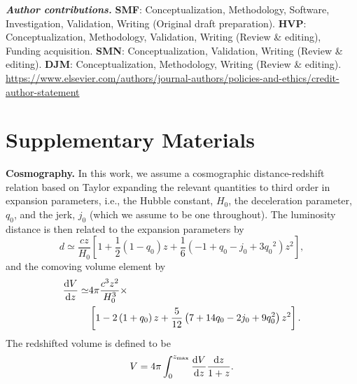\documentclass[%
 reprint,
 superscriptaddress,
 nofootinbib,
 amsmath,amssymb,
 aps,
]{revtex4-2}
\newcommand{\hubble}{\ensuremath{H_0}}
\newcommand{\decel}{\ensuremath{q_0}}
\newcommand{\jerk}{\ensuremath{j_0}}
\newcommand{\zmax}{\ensuremath{z_{\rm max}}}
\begin{document}
\textbf{\emph{Author contributions.}} {\bf SMF}: Conceptualization, Methodology, Software, Investigation, Validation, Writing (Original draft preparation). {\bf HVP}: Conceptualization, Methodology, Validation, Writing (Review \& editing), Funding acquisition. {\bf SMN}: Conceptualization, Validation, Writing (Review \& editing). {\bf DJM}: Conceptualization, Methodology, Writing (Review \& editing). \url{https://www.elsevier.com/authors/journal-authors/policies-and-ethics/credit-author-statement}


\appendix

\section{Supplementary Materials}

{\bf Cosmography.} In this work, we assume a cosmographic distance-redshift relation based on Taylor expanding the relevant quantities to third order in expansion parameters, i.e., the Hubble constant, \hubble, the deceleration parameter, \decel, and the jerk, $j_0$ (which we assume to be one throughout). The luminosity distance is then related to the expansion parameters by
\begin{equation}
d \simeq \frac{cz}{\hubble} \left[1 + \frac{1}{2} \left(1 - \decel \right) z + \frac{1}{6} \left(-1 + \decel - \jerk + 3 \decel^2 \right) z^2 \right],
\label{eq:distance}
\end{equation}
and the comoving volume element by
\begin{align}
\frac{{\rm d}V}{{\rm d}z} \simeq & 4\pi \frac{c^3 z^2}{\hubble^3} \times \label{eq:volel} \\
& \left[1 - 2 \left(1 + \decel \right) z + \frac{5}{12} \left(7 + 14 \decel - 2 \jerk + 9 \decel^2 \right) z^2 \right]. \nonumber
\end{align}
The redshifted volume is defined to be 
\begin{equation}
V = 4\pi \int_0^{\zmax} \frac{{\rm d}V}{{\rm d}z} \frac{{\rm d}z}{1+z}.
\label{eq:volume}
\end{equation}
\end{document}
